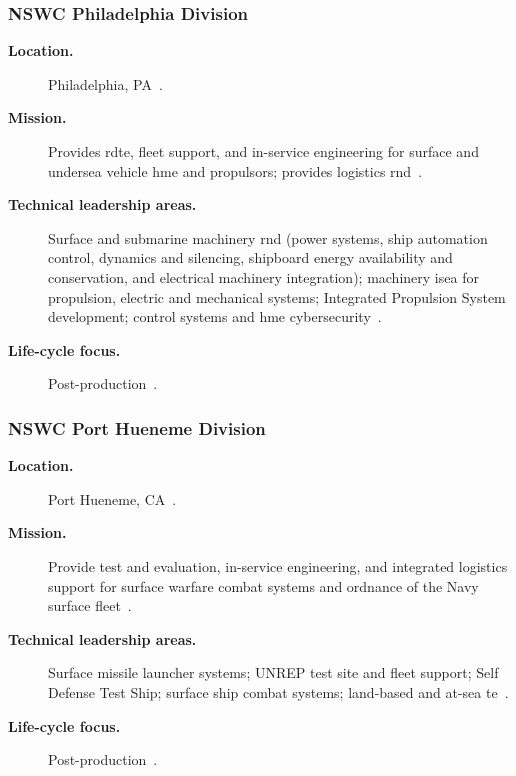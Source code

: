 \documentclass[../main.tex]{subfiles}
\begin{document}
\subsubsection{NSWC Philadelphia Division}
\begin{description}
  \item[\textbf{Location.}] Philadelphia, PA~\autocite{edo-2-1-4-warfare-centers-2024}.
  \item[\textbf{Mission.}] Provides \ac{rdte}, fleet support, and in-service engineering for surface and undersea vehicle \ac{hme} and propulsors; provides logistics \ac{rnd}~\autocite{edo-2-1-4-warfare-centers-2024}.
  \item[\textbf{Technical leadership areas.}] Surface and submarine machinery \ac{rnd} (power systems, ship automation control, dynamics and silencing, shipboard energy availability and conservation, and electrical machinery integration); machinery \ac{isea} for propulsion, electric and mechanical systems; Integrated Propulsion System development; control systems and \ac{hme} cybersecurity~\autocite{edo-2-1-4-warfare-centers-2024}.
  \item[\textbf{Life-cycle focus.}] Post-production~\autocite{edo-2-1-4-warfare-centers-2024}.
\end{description}

\subsubsection{NSWC Port Hueneme Division}
\begin{description}
  \item[\textbf{Location.}] Port Hueneme, CA~\autocite{edo-2-1-4-warfare-centers-2024}.
  \item[\textbf{Mission.}] Provide test and evaluation, in-service engineering, and integrated logistics support for surface warfare combat systems and ordnance of the Navy surface fleet~\autocite{edo-2-1-4-warfare-centers-2024}.
  \item[\textbf{Technical leadership areas.}] Surface missile launcher systems; UNREP test site and fleet support; Self Defense Test Ship; surface ship combat systems; land-based and at-sea \ac{te}~\autocite{edo-2-1-4-warfare-centers-2024}.
  \item[\textbf{Life-cycle focus.}] Post-production~\autocite{edo-2-1-4-warfare-centers-2024}.
\end{description}
\end{document}
